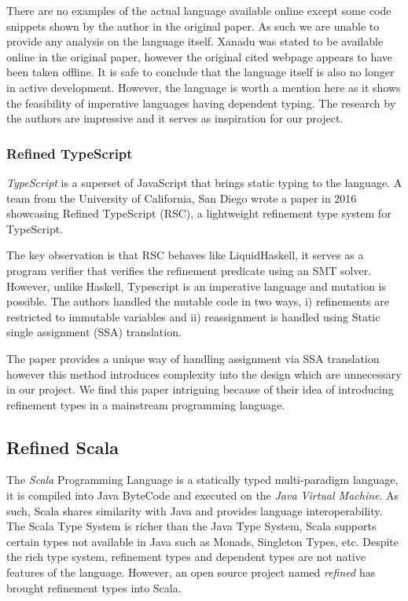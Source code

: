 \documentclass[a4paper,12pt]{report}
\begin{document}
\par
There are no examples of the actual language available online except some code 
snippets shown by the author in the original paper. As such we are unable to 
provide any analysis on the language itself. Xanadu was stated to be available 
online in the original paper, however the original cited webpage  
appears to have been taken offline. It is safe to conclude that the 
language itself is also no longer in active development. However, the 
language is worth a mention here as it shows the feasibility of 
imperative languages having dependent typing. The research by the authors 
are impressive and it serves as inspiration for our project. 

\subsubsection{Refined TypeScript}
\textit{TypeScript} is a superset of JavaScript that brings static typing to the 
language. A team from the University of California, San Diego wrote a paper \cite{rts} 
in 2016 showcasing Refined TypeScript (RSC), a lightweight refinement type 
system for TypeScript. 

\par
The key observation is that RSC behaves like LiquidHaskell, it serves as a program 
verifier that verifies the refinement predicate using an SMT solver. However, 
unlike Haskell, Typescript is an imperative language and mutation is possible. 
The authors handled the mutable code in two ways, i) refinements are 
restricted to immutable variables and ii) reassignment is handled using 
Static single assignment (SSA) translation.

\par
The paper provides a unique way of handling assignment via SSA translation 
however this method introduces complexity into the design which are unnecessary 
in our project. We find this paper intriguing because of their idea of 
introducing refinement types in a mainstream programming language. 

\subsection{Refined Scala}
The \textit{Scala} \cite{scala} Programming Language is a statically 
typed multi-paradigm language, it is compiled into Java ByteCode and 
executed on the \textit{Java Virtual Machine}. 
As such, Scala shares similarity with Java and provides language 
interoperability. The Scala Type System is richer than the Java Type System, 
Scala supports certain types not available in Java such as Monads, 
Singleton Types, etc. Despite the rich type system, refinement types and dependent 
types are not native features of the language. However, an open source project 
named \textit{refined} \cite{refinedScala} has brought refinement types into Scala. 
\end{document}
